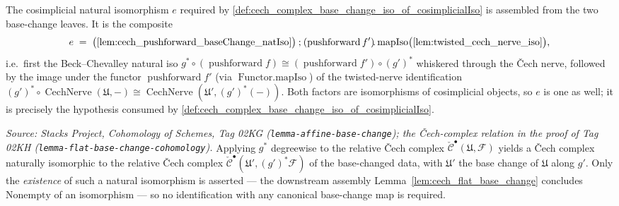 \begin{definition}
  \label{def:cech_complex_base_change_cosimplicialIso}
  The cosimplicial natural isomorphism \(e\) required by
  \cref{def:cech_complex_base_change_iso_of_cosimplicialIso} is assembled from the two
  base-change leaves. It is the composite
  \[
    e \;=\;
      \bigl(\cref{lem:cech_pushforward_baseChange_natIso}\bigr)
      \mathbin{;}
      (\operatorname{pushforward} f')\!.\operatorname{mapIso}
        \bigl(\cref{lem:twisted_cech_nerve_iso}\bigr),
  \]
  i.e.\ first the Beck--Chevalley natural iso
  \(g^* \circ (\operatorname{pushforward} f) \cong (\operatorname{pushforward} f')
  \circ (g')^*\) whiskered through the {\v C}ech nerve, followed by the image under the
  functor \(\operatorname{pushforward} f'\) (via \(\operatorname{Functor.mapIso}\)) of the
  twisted-nerve identification
  \((g')^* \circ \operatorname{CechNerve}(\mathfrak{U}, -) \cong
  \operatorname{CechNerve}(\mathfrak{U}', (g')^*(-))\). Both factors are isomorphisms of
  cosimplicial objects, so \(e\) is one as well; it is precisely the hypothesis consumed
  by \cref{def:cech_complex_base_change_iso_of_cosimplicialIso}.
\end{definition}

\begin{definition}
  \label{def:cech_complex_base_change_iso}
  \textit{Source: Stacks Project, Cohomology of Schemes, Tag 02KG
  (\texttt{lemma-affine-base-change}); the {\v C}ech-complex relation in the proof of
  Tag 02KH (\texttt{lemma-flat-base-change-cohomology}).}
  Applying \(g^*\) degreewise to the relative {\v C}ech complex
  \(\check{\mathcal{C}}^\bullet(\mathfrak{U}, \mathcal{F})\) yields a {\v C}ech complex
  naturally isomorphic to the relative {\v C}ech complex
  \(\check{\mathcal{C}}^\bullet(\mathfrak{U}', (g')^*\mathcal{F})\) of the base-changed
  data, with \(\mathfrak{U}'\) the base change of \(\mathfrak{U}\) along \(g'\). Only the
  \emph{existence} of such a natural isomorphism is asserted --- the downstream
  assembly Lemma~\ref{lem:cech_flat_base_change} concludes \(\mathrm{Nonempty}\) of an
  isomorphism --- so no identification with any canonical base-change map is required.
\end{definition}


